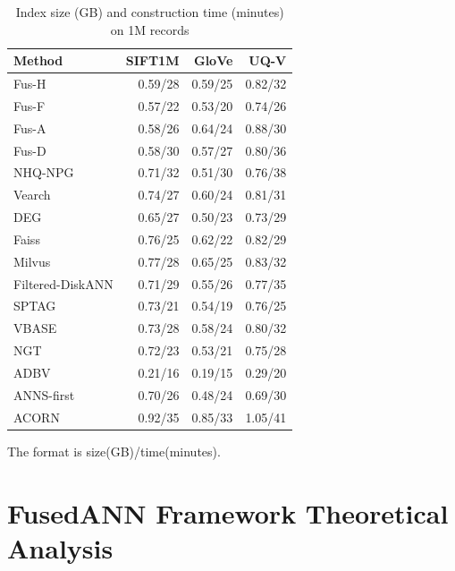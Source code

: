 \documentclass[numbers,sort]{article}
\begin{document}
\begin{table}[h]
\centering
\begin{threeparttable}
\caption{Index size (GB) and construction time (minutes) on 1M records}
\label{tab:memory_construction}
\begin{tabular}{lrrr}
\toprule
Method & SIFT1M & GloVe & UQ-V \\
\midrule
Fus-H            & 0.59/28 & 0.59/25 & 0.82/32 \\
Fus-F            & 0.57/22 & 0.53/20 & 0.74/26 \\
Fus-A            & 0.58/26 & 0.64/24 & 0.88/30 \\
Fus-D            & 0.58/30 & 0.57/27 & 0.80/36 \\
NHQ-NPG          & 0.71/32 & 0.51/30 & 0.76/38 \\
Vearch           & 0.74/27 & 0.60/24 & 0.81/31 \\
DEG              & 0.65/27 & 0.50/23 & 0.73/29 \\
Faiss            & 0.76/25 & 0.62/22 & 0.82/29 \\
Milvus           & 0.77/28 & 0.65/25 & 0.83/32 \\
Filtered-DiskANN & 0.71/29 & 0.55/26 & 0.77/35 \\
SPTAG            & 0.73/21 & 0.54/19 & 0.76/25 \\
VBASE            & 0.73/28 & 0.58/24 & 0.80/32 \\
NGT              & 0.72/23 & 0.53/21 & 0.75/28 \\
ADBV             & 0.21/16 & 0.19/15 & 0.29/20 \\
ANNS-first       & 0.70/26 & 0.48/24 & 0.69/30 \\
ACORN            & 0.92/35 & 0.85/33 & 1.05/41 \\
\bottomrule
\end{tabular}
\begin{tablenotes}
\small
\item The format is size(GB)/time(minutes).
\end{tablenotes}
\end{threeparttable}
\end{table}

\section{FusedANN Framework Theoretical Analysis}
\label{sec:fcvi-theo}
\end{document}
